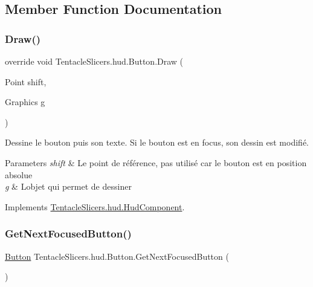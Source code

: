 \subsection{Member Function Documentation}
\mbox{\label{class_tentacle_slicers_1_1hud_1_1_button_a56c59149f165a05312d75cf1e1fea3fd}} 
\subsubsection{\texorpdfstring{Draw()}{Draw()}}
{\footnotesize\ttfamily override void Tentacle\+Slicers.\+hud.\+Button.\+Draw (\begin{DoxyParamCaption}\item[{Point}]{shift,  }\item[{Graphics}]{g }\end{DoxyParamCaption})\hspace{0.3cm}{\ttfamily [virtual]}}



Dessine le bouton puis son texte. Si le bouton est en focus, son dessin est modifié. 


\begin{DoxyParams}{Parameters}
{\em shift} & Le point de référence, pas utilisé car le bouton est en position absolue \\
\hline
{\em g} & L\textquotesingle{}objet qui permet de dessiner \\
\hline
\end{DoxyParams}


Implements \hyperlink{class_tentacle_slicers_1_1hud_1_1_hud_component}{Tentacle\+Slicers.\+hud.\+Hud\+Component}.

\mbox{\label{class_tentacle_slicers_1_1hud_1_1_button_a5f7c33e7dee80c333c1d3db7ff717ab4}} 
\subsubsection{\texorpdfstring{Get\+Next\+Focused\+Button()}{GetNextFocusedButton()}}
{\footnotesize\ttfamily \hyperlink{class_tentacle_slicers_1_1hud_1_1_button}{Button} Tentacle\+Slicers.\+hud.\+Button.\+Get\+Next\+Focused\+Button (\begin{DoxyParamCaption}{ }\end{DoxyParamCaption})}



